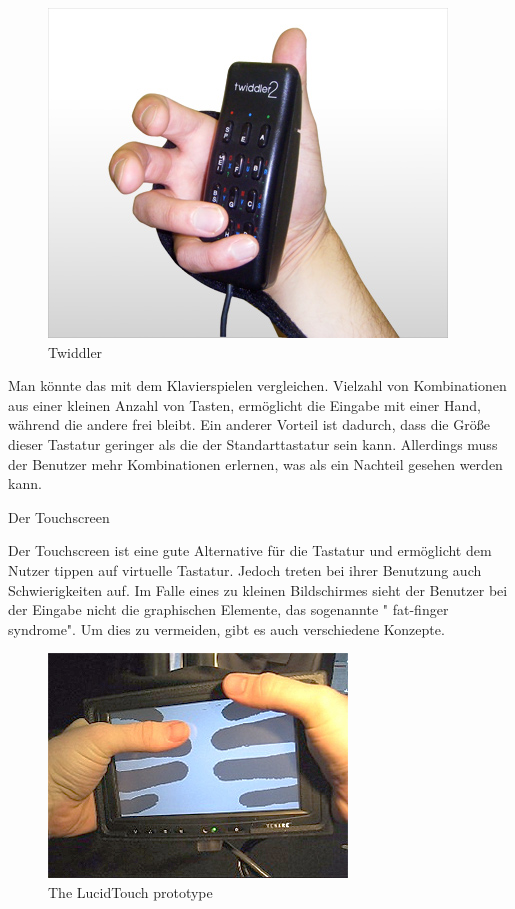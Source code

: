  \begin{figure}[h]
 \centering
 \includegraphics[height=0.25\textheight]{img/twiddler.jpg}
 \caption{Twiddler}\label{fig:twiddler}
\end{figure}

Man könnte das mit dem Klavierspielen vergleichen. Vielzahl von Kombinationen aus einer kleinen Anzahl von Tasten, ermöglicht die Eingabe mit einer Hand, während die andere frei bleibt. Ein anderer Vorteil ist dadurch, dass die Größe dieser Tastatur geringer als die der Standarttastatur sein kann. Allerdings muss der Benutzer mehr Kombinationen erlernen, was als ein Nachteil gesehen werden kann.


Der Touchscreen

Der Touchscreen ist eine gute Alternative für die Tastatur und ermöglicht dem Nutzer tippen auf virtuelle Tastatur. Jedoch treten bei ihrer Benutzung auch Schwierigkeiten auf. Im Falle eines zu kleinen Bildschirmes sieht der Benutzer bei der Eingabe nicht die graphischen Elemente, das sogenannte " fat-finger syndrome".  Um dies zu vermeiden, gibt es auch verschiedene Konzepte.

 \begin{figure}[h]
 \centering
 \includegraphics[height=0.25\textheight]{img/lucidtouch.jpg}
 \caption{The LucidTouch prototype}\label{fig:lucid}
\end{figure}

